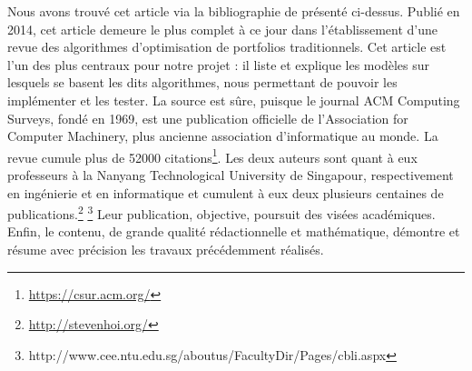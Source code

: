 \documentclass[a4paper]{article}
\begin{document}
\textbf{}

Nous avons trouvé cet article via la bibliographie de \citet{Jiang2017} présenté ci-dessus. Publié en 2014, cet article demeure le plus complet à ce jour dans l'établissement d'une revue des algorithmes d'optimisation de portfolios traditionnels. Cet article est l'un des plus centraux pour notre projet : il liste et explique les modèles sur lesquels se basent les dits algorithmes, nous permettant de pouvoir les implémenter et les tester. La source est sûre, puisque le journal ACM Computing Surveys, fondé en 1969, est une publication officielle de l'Association for Computer Machinery, plus ancienne association d'informatique au monde. La revue cumule plus de 52000 citations\footnote{\url{https://csur.acm.org/}}. Les deux auteurs sont quant à eux professeurs à la Nanyang Technological University de Singapour, respectivement en ingénierie et en informatique et cumulent à eux deux plusieurs centaines de publications.\footnote{\url{http://stevenhoi.org/}} \footnote{{http://www.cee.ntu.edu.sg/aboutus/FacultyDir/Pages/cbli.aspx}}
Leur publication, objective, poursuit des visées académiques. Enfin, le contenu, de grande qualité rédactionnelle et mathématique, démontre et résume avec précision les travaux précédemment réalisés.
\end{document}
